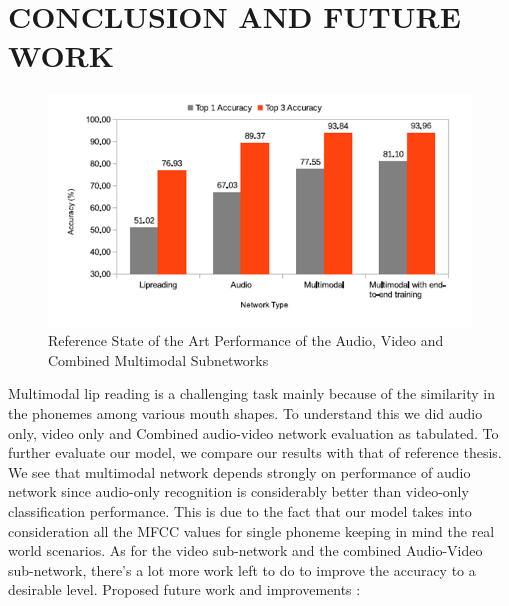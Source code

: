 \documentclass{article}
\begin{document}
\section{CONCLUSION AND FUTURE WORK}
\begin{figure}
\centering
\includegraphics[scale=0.7]{SOTA.png}
\caption{\label{fig:Reference Results} Reference State of the Art Performance of the Audio, Video and Combined Multimodal Subnetworks}
\end{figure}
Multimodal lip reading is a challenging task mainly because of the similarity in the phonemes among various mouth shapes. To understand this we did audio only, video only and Combined audio-video network evaluation as tabulated. To further evaluate our model, we compare our results with that of reference thesis\cite{Thesis}. We see that multimodal network depends strongly on performance of audio network since audio-only recognition is considerably better than video-only classification performance. This is due to the fact that our model takes into consideration all the MFCC values for single phoneme keeping in mind the real world scenarios. As for the video sub-network and the combined Audio-Video sub-network, there's a lot more work left to do to improve the accuracy to a desirable level.
\newline \newline \newline
Proposed future work and improvements :
\end{document}
